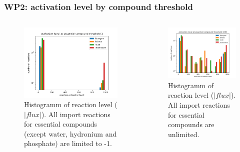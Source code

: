 \documentclass[serif,10pt,aspectratio=169]{beamer}
\begin{document}
\begin{frame}\frametitle{WP2: activation level by compound threshold}
	\begin{columns}[t]
		\begin{figure}
			\includegraphics[width=\textwidth]{images/activation_level_by_theshold_1.png}
			\caption{Histogramm of reaction level ($|flux|$). All import reactions for essential compounds (except water, hydronium and phosphate) are limited to -1.}
		\end{figure}
	
		\begin{figure}
			\includegraphics[width=\textwidth]{images/activation_level_by_theshold_1000.png}
			\caption{Histogramm of reaction level ($|flux|$). All import reactions for essential compounds are unlimited.}
		\end{figure}
	\end{columns}
\end{frame}
\end{document}
